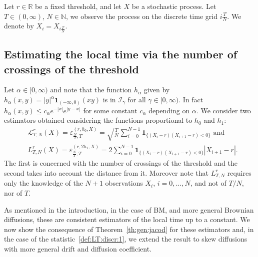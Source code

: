 \documentclass[12pt]{article}
\numberwithin{equation}{section}
\theoremstyle{definition}
\theoremstyle{remark}
\newcommand{\NN}{\mathbb{N}}
\newcommand{\RR}{\mathbb{R}}
\newcommand{\ind}[1]{\mathbf{1}_{#1}}
\newcommand{\vd}{\,\mathrm{d}}
\newcommand{\Lg}[1]{\mathcal{I}_{#1}}
\begin{document}
Let $r\in \RR$ be a fixed threshold, and let $X$ be a stochastic process. 
Let $T\in (0,\infty)$, $N\in \NN$, we observe the process on the discrete time grid $i \frac{T}{N}$. We denote by $X_i = X_{ i \frac{T}{N}}$.


\subsection{Estimating the local time via the number of crossings of the threshold }%
\label{sec:applications}


Let $\alpha\in [0,\infty)$ and note that the function $h_\alpha$ given by $h_\alpha (x,y) = |y|^\alpha \ind{(-\infty,0)}(x y)$ is in $\Lg{\gamma}$ for all $\gamma\in [0,\infty)$. 
In fact $  h_\alpha(x,y) \leq c_\alpha e^{-|x|} e^{|y-x|}$ for some constant $c_\alpha$ depending on $\alpha$.
We consider two estimators obtained considering the functions proportional to $h_0$ and $h_1$:
\begin{align} 
& \label{def:LT:discr:1}
\mathcal{L}^r_{T,N}(X)
=  \varepsilon_{\frac{N}{T},T}^{(r,h_0,X)}
= \sqrt{ \frac{T}{N}}\sum_{i=0}^{N-1} \ind{\{(X_i-r)(X_{i+1}-r)<0\}}
\text{ and }
\\
& \label{def:LT:discr}
L^r_{T,N}(X)
= \varepsilon_{\frac{N}{T},T}^{(r, 2 h_1,X)}
= 2 \sum_{i=0}^{N -1} \ind{\{(X_i-r)(X_{i+1}-r)<0\}}|X_{i+1}-r|.
\end{align}
%
The first is concerned with the number of crossings of the threshold and the second takes into account the distance from it. Moreover note that $L^r_{T,N}$ requires only the knowledge of the $N+1$ observations $X_i$, $i=0,\ldots,N$, and not of $T/N$, nor of $T$.

As mentioned in the introduction, in the case of BM, and more general Brownian diffusions, these are consistent estimators of the local time up to a constant. 
We now show the consequence of Theorem~\ref{th:gen:jacod} for these estimators and, in the case of the statistic~\eqref{def:LT:discr:1}, we extend the result to skew diffusions with more general drift and diffusion coefficient. %

\end{document}
